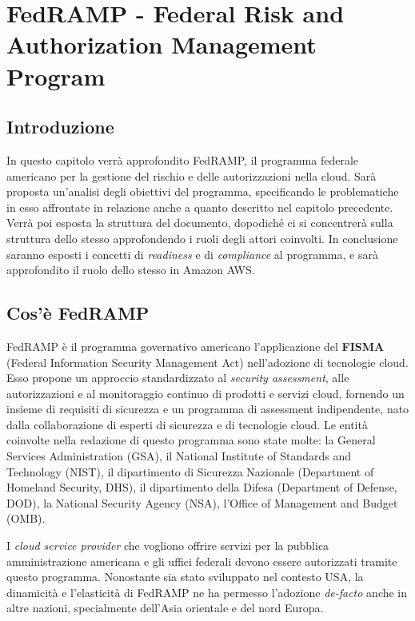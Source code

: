 \documentclass[../main.tex]{subfiles}
\begin{document}
\chapter{FedRAMP - Federal Risk and Authorization Management Program}
\section{Introduzione}
In questo capitolo verrà approfondito FedRAMP, il programma federale americano per la gestione del rischio e delle autorizzazioni nella cloud.
Sarà proposta un'analisi degli obiettivi del programma, specificando le problematiche in esso affrontate in relazione anche a quanto descritto nel capitolo precedente.
Verrà poi esposta la struttura del documento, dopodiché ci si concentrerà sulla struttura dello stesso approfondendo i ruoli degli attori coinvolti.
In conclusione saranno esposti i concetti di \textit{readiness} e di \textit{compliance} al programma, e sarà approfondito il ruolo dello stesso in Amazon AWS.

\section{Cos'è FedRAMP}
FedRAMP è il programma governativo americano l'applicazione del \textbf{FISMA} (Federal Information Security Management Act) nell'adozione di tecnologie cloud.
Esso propone un approccio standardizzato al \textit{security assessment}, alle autorizzazioni e al monitoraggio continuo di prodotti e servizi cloud, fornendo un insieme di requisiti di sicurezza e un programma di assessment indipendente, nato dalla collaborazione di esperti di sicurezza e di tecnologie cloud.
Le entità coinvolte nella redazione di questo programma sono state molte: la General Services Administration (GSA), il National Institute of Standards and Technology (NIST), il dipartimento di Sicurezza Nazionale (Department of Homeland Security, DHS), il dipartimento della Difesa (Department of Defense, DOD), la National Security Agency (NSA), l'Office of Management and Budget (OMB).

I \textit{cloud service provider} che vogliono offrire servizi per la pubblica amministrazione americana e gli uffici federali devono essere autorizzati tramite questo programma.
Nonostante sia stato sviluppato nel contesto USA, la dinamicità e l'elasticità di FedRAMP ne ha permesso l'adozione \textit{de-facto} anche in altre nazioni, specialmente dell'Asia orientale e del nord Europa.
\end{document}
